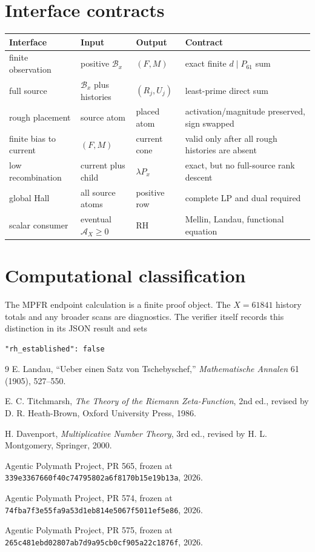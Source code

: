 \documentclass[11pt]{article}
\newcommand{\Ann}{\mathcal A}
\newcommand{\Base}{\mathcal B}
\begin{document}
\section{Interface contracts}
\begin{longtable}{@{}p{}p{}p{}p{}@{}}
\toprule
Interface & Input & Output & Contract \\
\midrule
\endhead
finite observation & positive $\Base_x$ & $(F,M)$ & exact finite $d\mid P_{61}$ sum \\
full source & $\Base_x$ plus histories & $(R_j,U_j)$ & least-prime direct sum \\
rough placement & source atom & placed atom & activation/magnitude preserved, sign swapped \\
finite bias to current & $(F,M)$ & current cone & valid only after all rough histories are absent \\
low recombination & current plus child & $\lambda P_x$ & exact, but no full-source rank descent \\
global Hall & all source atoms & positive row & complete LP and dual required \\
scalar consumer & eventual $\Ann_X\ge0$ & RH & Mellin, Landau, functional equation \\
\bottomrule
\end{longtable}

\section{Computational classification}
The MPFR endpoint calculation is a finite proof object.  The $X=61841$ history totals and any broader scans are diagnostics.  The verifier itself records this distinction in its JSON result and sets
\begin{lstlisting}[basicstyle=\ttfamily\small]
"rh_established": false
\end{lstlisting}

\begin{thebibliography}{9}
E. Landau, ``Ueber einen Satz von Tschebyschef,'' \emph{Mathematische Annalen} 61 (1905), 527--550.

E. C. Titchmarsh, \emph{The Theory of the Riemann Zeta-Function}, 2nd ed., revised by D. R. Heath-Brown, Oxford University Press, 1986.

H. Davenport, \emph{Multiplicative Number Theory}, 3rd ed., revised by H. L. Montgomery, Springer, 2000.

Agentic Polymath Project, PR 565, frozen at \texttt{339e3367660f40c74795802a6f8170b15e19b13a}, 2026.

Agentic Polymath Project, PR 574, frozen at \texttt{74fba7f3e55fa9a53d1eb814e5067f5011ef5e86}, 2026.

Agentic Polymath Project, PR 575, frozen at \texttt{265c481ebd02807ab7d9a95cb0cf905a22c1876f}, 2026.
\end{thebibliography}
\end{document}
